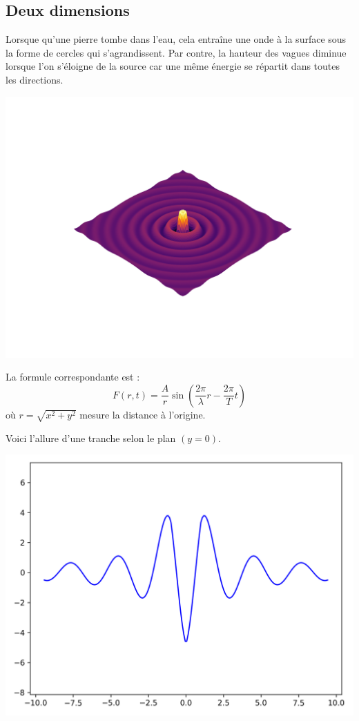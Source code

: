 \documentclass[11pt,class=report,crop=false]{standalone}
\begin{document}
\subsection{Deux dimensions}

Lorsque qu'une pierre tombe dans l'eau, cela entraîne  une onde à la surface sous la forme de cercles qui s'agrandissent. Par contre, la hauteur des vagues diminue lorsque l'on s'éloigne de la source car une même énergie se répartit dans toutes les directions.

\begin{center}		
	\includegraphics[scale=\myscale,scale=0.8,trim={0 2.5cm 0 3cm},clip]{figures/ondes2D-2}	
\end{center}

La formule correspondante est :
$$F(r,t) = \frac{A}{r} \sin\left(\frac{2\pi}{\lambda} r -  \frac{2\pi}{T} t\right)$$
où $r = \sqrt{x^2+y^2}$ mesure la distance à l'origine.

Voici l'allure d'une tranche selon le plan $(y=0)$.
\begin{center}
	\includegraphics[scale=\myscale,scale=0.4]{figures/ondes2D-1}
\end{center}
\end{document}
